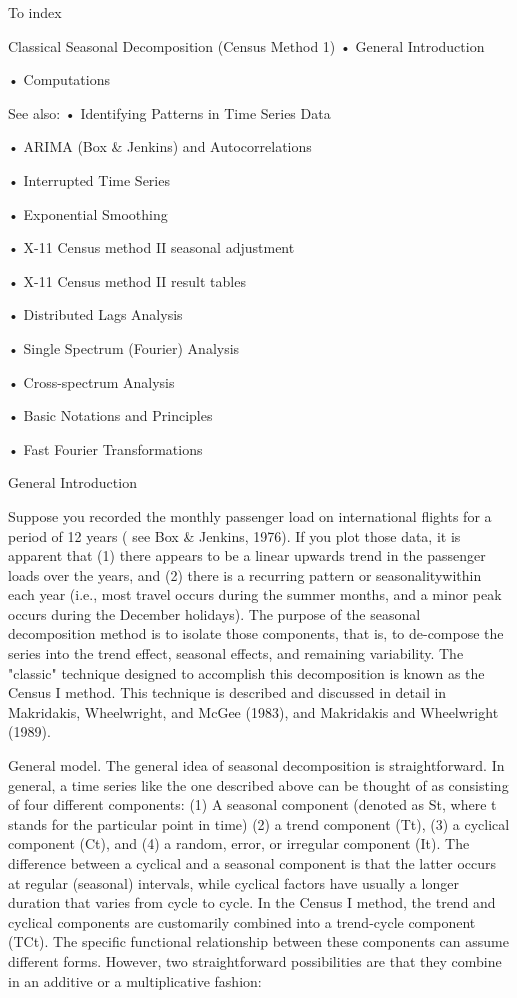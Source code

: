 To index
 




 

Classical Seasonal Decomposition (Census Method 1)
•
General Introduction

•
Computations


See also:
•
Identifying Patterns in Time Series Data

•
ARIMA (Box & Jenkins) and Autocorrelations

•
Interrupted Time Series

•
Exponential Smoothing

•
X-11 Census method II seasonal adjustment

•
X-11 Census method II result tables

•
Distributed Lags Analysis

•
Single Spectrum (Fourier) Analysis

•
Cross-spectrum Analysis

•
Basic Notations and Principles

•
Fast Fourier Transformations



General Introduction

Suppose you recorded the monthly passenger load on international flights for a period of 12 years ( see Box & Jenkins, 1976). If you plot those data, it is apparent that (1) there appears to be a linear upwards trend in the passenger loads over the years, and (2) there is a recurring pattern or seasonalitywithin each year (i.e., most travel occurs during the summer months, and a minor peak occurs during the December holidays). The purpose of the seasonal decomposition method is to isolate those components, that is, to de-compose the series into the trend effect, seasonal effects, and remaining variability. The "classic" technique designed to accomplish this decomposition is known as the Census I method. This technique is described and discussed in detail in Makridakis, Wheelwright, and McGee (1983), and Makridakis and Wheelwright (1989).

General model. The general idea of seasonal decomposition is straightforward. In general, a time series like the one described above can be thought of as consisting of four different components: (1) A seasonal component (denoted as St, where t stands for the particular point in time) (2) a trend component (Tt), (3) a cyclical component (Ct), and (4) a random, error, or irregular component (It). The difference between a cyclical and a seasonal component is that the latter occurs at regular (seasonal) intervals, while cyclical factors have usually a longer duration that varies from cycle to cycle. In the Census I method, the trend and cyclical components are customarily combined into a trend-cycle component (TCt). The specific functional relationship between these components can assume different forms. However, two straightforward possibilities are that they combine in an additive or a multiplicative fashion:

